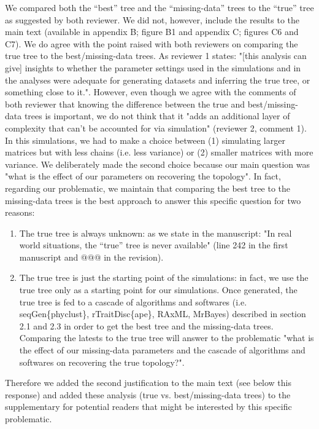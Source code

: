 \documentclass[12pt,letterpaper]{article}
\begin{document}
\begin{enumerate}
We compared both the ``best'' tree and the ``missing-data'' trees to the ``true'' tree as suggested by both reviewer.
We did not, however, include the results to the main text (available in appendix B; figure B1 and appendix C; figures C6 and C7).
We do agree with the point raised with both reviewers on comparing the true tree to the best/missing-data trees.
As reviewer 1 states: "[this analysis can give] insights to whether the parameter settings used in the simulations and in the analyses were adequate for generating datasets and inferring the true tree, or something close to it.".
However, even though we agree with the comments of both reviewer that knowing the difference between the true and best/missing-data trees is important, we do not think that it "adds an additional layer of complexity that can't be accounted for via simulation" (reviewer 2, comment 1).
In this simulations, we had to make a choice between (1) simulating larger matrices but with less chains (i.e. less variance) or (2) smaller matrices with more variance.
We deliberately made the second choice because our main question was "what is the effect of our parameters on recovering the topology".
In fact, regarding our problematic, we maintain that comparing the best tree to the missing-data trees is the best approach to answer this specific question for two reasons:
\begin{enumerate}
\item{The true tree is always unknown:} as we state in the manuscript: "In real world situations, the ``true'' tree is never available" (line 242 in the first manuscript and @@@ in the revision).
\item{The true tree is just the starting point of the simulations:} in fact, we use the true tree only as a starting point for our simulations. Once generated, the true tree is fed to a cascade of algorithms and softwares (i.e. seqGen\{phyclust\}, rTraitDisc\{ape\}, RAxML, MrBayes) described in section 2.1 and 2.3 in order to get the best tree and the missing-data trees. Comparing the latests to the true tree will answer to the problematic "what is the effect of our missing-data parameters and the cascade of algorithms and softwares on recovering the true topology?".
\end{enumerate}
Therefore we added the second justification to the main text (see below this response) and added these analysis (true vs. best/missing-data trees) to the supplementary for potential readers that might be interested by this specific problematic.


\end{enumerate}
\end{document}
